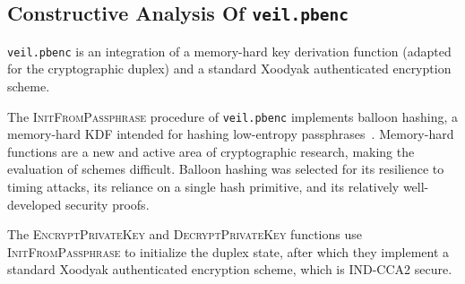 \subsection{Constructive Analysis Of \texttt{veil.pbenc}}\label{subsec:veil.pbenc-analysis}

\texttt{veil.pbenc} is an integration of a memory-hard key derivation function (adapted for the cryptographic duplex)
and a standard Xoodyak authenticated encryption scheme.

The \textsc{InitFromPassphrase} procedure of \texttt{veil.pbenc} implements balloon hashing, a memory-hard KDF intended
for hashing low-entropy passphrases~\cite{boneh2016}.
Memory-hard functions are a new and active area of cryptographic research, making the evaluation of schemes difficult.
Balloon hashing was selected for its resilience to timing attacks, its reliance on a single hash primitive, and its
relatively well-developed security proofs.

The \textsc{EncryptPrivateKey} and \textsc{DecryptPrivateKey} functions use \textsc{InitFromPassphrase} to initialize
the duplex state, after which they implement a standard Xoodyak authenticated encryption scheme, which is IND-CCA2
secure.
